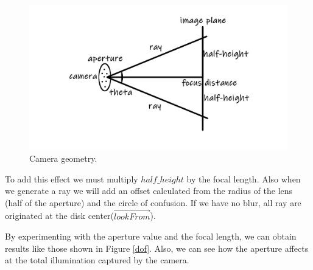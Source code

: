 \documentclass[titlepage,12pt]{report}
\begin{document}
\begin{figure}[!ht]
	\centering
	\includegraphics[scale=0.65]{media/camera-model-summary-2.jpg}
	\caption{Camera geometry.}
	\label{camegeom3}
\end{figure}

To add this effect we must multiply $half\_height$ by the focal length. Also when we generate a ray we will add an offset calculated from the radius of the lens (half of the aperture) and the circle of confusion. If we have no blur, all ray are originated at the disk center($\vec{lookFrom}$).

By experimenting with the aperture value and the focal length, we can obtain results like those shown in Figure \ref{dof}. Also, we can see how the aperture affects at the total illumination captured by the camera.
\end{document}
